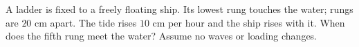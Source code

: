 A ladder is fixed to a freely floating ship. Its lowest rung touches the water; rungs are $20$ cm apart. The tide rises $10$ cm per hour and the ship rises with it. When does the fifth rung meet the water? Assume no waves or loading changes.
